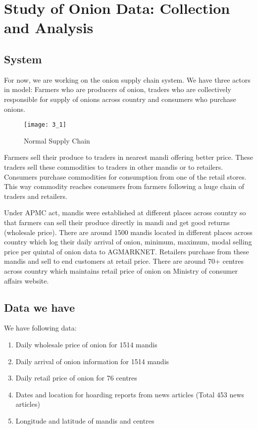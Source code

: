 \chapter{Study of Onion Data: Collection and Analysis}


\section{System}

For now, we are working on the onion supply chain system. We have three actors in model: Farmers who are producers of onion, traders who are collectively responsible for supply of onions across country and consumers who purchase onions.

\begin{figure}[h]
\begin{center}    
\texttt{[image: 3\_1]}
\caption{Normal Supply Chain}
\label{fig:Normal Supply Chain}
\end{center}
\end{figure}

Farmers sell their produce to traders in nearest mandi offering better price. These traders sell these commodities to traders in other mandis or to retailers. Consumers purchase commodities for consumption from one of the retail stores. This way commodity reaches consumers from farmers following a huge chain of traders and retailers.

Under APMC act, mandis were established at different places across country so that farmers can sell their produce directly in mandi and get good returns (wholesale price). There are around 1500 mandis located in different places across country which log their daily arrival of onion, minimum, maximum, modal selling price per quintal of onion data to AGMARKNET. Retailers purchase from these mandis and sell to end customers at retail price. There are around 70+ centres across country which maintains retail price of onion on Ministry of consumer affairs website.

\section{Data we have}

We have following data:

\begin{enumerate}

\item Daily wholesale price of onion for 1514 mandis
\item Daily arrival of onion information for 1514 mandis
\item Daily retail price of onion for 76 centres
\item Dates and location for hoarding reports from news articles (Total 453 news articles)
\item Longitude and latitude of mandis and centres

\end{enumerate}


